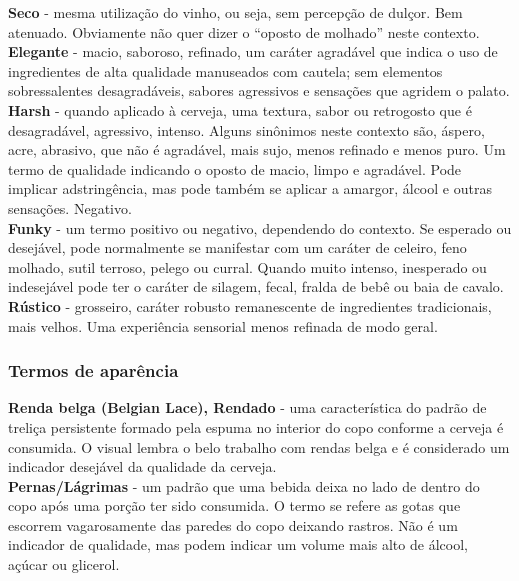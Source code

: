 \textbf{Seco} - mesma utilização do vinho, ou seja, sem percepção de dulçor. Bem atenuado. Obviamente não quer dizer o “oposto de molhado” neste contexto.\\
\textbf{Elegante} - macio, saboroso, refinado, um caráter agradável que indica o uso de ingredientes de alta qualidade manuseados com cautela; sem elementos sobressalentes desagradáveis, sabores agressivos e sensações que agridem o palato.\\
\textbf{Harsh} - quando aplicado à cerveja, uma textura, sabor ou retrogosto que é desagradável, agressivo, intenso. Alguns sinônimos neste contexto são, áspero, acre, abrasivo, que não é agradável, mais sujo, menos refinado e menos puro. Um termo de qualidade indicando o oposto de macio, limpo e agradável. Pode implicar adstringência, mas pode também se aplicar a amargor, álcool e outras sensações. Negativo.\\
\textbf{Funky} - um termo positivo ou negativo, dependendo do contexto. Se esperado ou desejável, pode normalmente se manifestar com um caráter de celeiro, feno molhado, sutil terroso, pelego ou curral. Quando muito intenso, inesperado ou indesejável pode ter o caráter de silagem, fecal, fralda de bebê ou baia de cavalo.\\
\textbf{Rústico} - grosseiro, caráter robusto remanescente de ingredientes tradicionais, mais velhos. Uma experiência sensorial menos refinada de modo geral.
\subsubsection*{Termos de aparência}
\textbf{Renda belga (Belgian Lace), Rendado} - uma característica do padrão de treliça persistente formado pela espuma no interior do copo conforme a cerveja é consumida. O visual lembra o belo trabalho com rendas belga e é considerado um indicador desejável da qualidade da cerveja.\\
\textbf{Pernas/Lágrimas} - um padrão que uma bebida deixa no lado de dentro do copo após uma porção ter sido consumida. O termo se refere as gotas que escorrem vagarosamente das paredes do copo deixando rastros. Não é um indicador de qualidade, mas podem indicar um volume mais alto de álcool, açúcar ou glicerol.\\